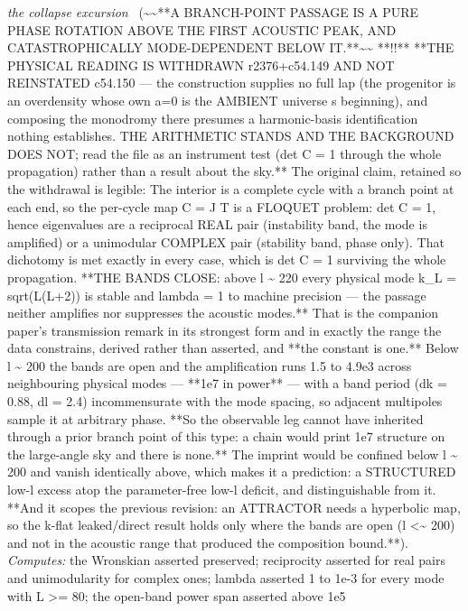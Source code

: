 \begin{description}
\textit{the collapse excursion} \ (\textasciitilde{}\textasciitilde{}**A BRANCH-POINT PASSAGE IS A PURE PHASE ROTATION ABOVE THE FIRST ACOUSTIC PEAK, AND CATASTROPHICALLY MODE-DEPENDENT BELOW IT.**\textasciitilde{}\textasciitilde{} **!!** **THE PHYSICAL READING IS WITHDRAWN r2376+c54.149 AND NOT REINSTATED c54.150 --- the construction supplies no full lap (the progenitor is an overdensity whose own a=0 is the AMBIENT universe s beginning), and composing the monodromy there presumes a harmonic-basis identification nothing establishes. THE ARITHMETIC STANDS AND THE BACKGROUND DOES NOT; read the file as an instrument test (det C = 1 through the whole propagation) rather than a result about the sky.** The original claim, retained so the withdrawal is legible: The interior is a complete cycle with a branch point at each end, so the per-cycle map C = J T is a FLOQUET problem: det C = 1, hence eigenvalues are a reciprocal REAL pair (instability band, the mode is amplified) or a unimodular COMPLEX pair (stability band, phase only). That dichotomy is met exactly in every case, which is det C = 1 surviving the whole propagation. **THE BANDS CLOSE: above l \textasciitilde{} 220 every physical mode k\_L = sqrt(L(L+2)) is stable and \textbar{}lambda\textbar{} = 1 to machine precision --- the passage neither amplifies nor suppresses the acoustic modes.** That is the companion paper's transmission remark in its strongest form and in exactly the range the data constrains, derived rather than asserted, and **the constant is one.** Below l \textasciitilde{} 200 the bands are open and the amplification runs 1.5 to 4.9e3 across neighbouring physical modes --- **1e7 in power** --- with a band period (dk = 0.88, dl = 2.4) incommensurate with the mode spacing, so adjacent multipoles sample it at arbitrary phase. **So the observable leg cannot have inherited through a prior branch point of this type: a chain would print 1e7 structure on the large-angle sky and there is none.** The imprint would be confined below l \textasciitilde{} 200 and vanish identically above, which makes it a prediction: a STRUCTURED low-l excess atop the parameter-free low-l deficit, and distinguishable from it. **And it scopes the previous revision: an ATTRACTOR needs a hyperbolic map, so the k-flat leaked/direct result holds only where the bands are open (l <\textasciitilde{} 200) and not in the acoustic range that produced the composition bound.**). 
\emph{Computes:} the Wronskian asserted preserved; reciprocity asserted for real pairs and unimodularity for complex ones; \textbar{}lambda\textbar{} asserted 1 to 1e-3 for every mode with L >= 80; the open-band power span asserted above 1e5

\end{description}
